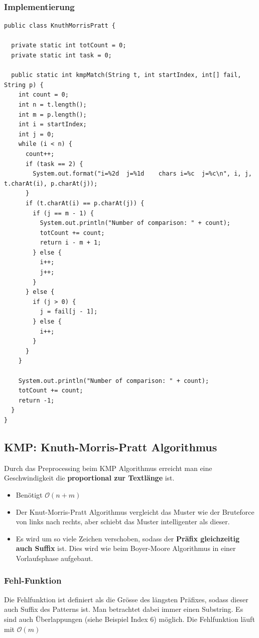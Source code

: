 \subsubsection{Implementierung}
\begin{lstlisting}
public class KnuthMorrisPratt {

  private static int totCount = 0;
  private static int task = 0;

  public static int kmpMatch(String t, int startIndex, int[] fail, String p) {
    int count = 0;
    int n = t.length();
    int m = p.length();
    int i = startIndex;
    int j = 0;
    while (i < n) {
      count++;
      if (task == 2) {
        System.out.format("i=%2d  j=%1d    chars i=%c  j=%c\n", i, j, t.charAt(i), p.charAt(j));
      }
      if (t.charAt(i) == p.charAt(j)) {
        if (j == m - 1) {
          System.out.println("Number of comparison: " + count);
          totCount += count;
          return i - m + 1;
        } else {
          i++;
          j++;
        }
      } else {
        if (j > 0) {
          j = fail[j - 1];
        } else {
          i++;
        }
      }
    }

    System.out.println("Number of comparison: " + count);
    totCount += count;
    return -1;
  }
}
\end{lstlisting}
\clearpage


\subsection{KMP: Knuth-Morris-Pratt Algorithmus}
Durch das Preprocessing beim KMP Algorithmus erreicht man eine Geschwindigkeit die \textbf{proportional zur Textlänge} ist.
\begin{itemize}
	\item Benötigt $\mathcal{O}(n + m)$
	\item Der Knut-Morris-Pratt Algorithmus vergleicht das Muster wie der Bruteforce von links nach rechts, aber schiebt das Muster intelligenter als dieser.
	\item Es wird um so viele Zeichen verschoben, sodass der \textbf{Präfix gleichzeitig auch Suffix} ist. Dies wird wie beim Boyer-Moore Algorithmus in einer Vorlaufsphase aufgebaut.
\end{itemize}

\subsubsection{Fehl-Funktion}
Die Fehlfunktion ist definiert als die Grösse des längsten Präfixes, sodass dieser auch Suffix des Patterns ist. Man betrachtet dabei immer einen Substring. Es sind auch Überlappungen (siehe Beispiel Index 6) möglich. Die Fehlfunktion läuft mit $\mathcal{O}(m)$

